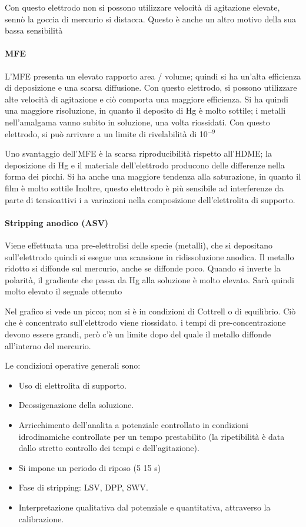 Con questo elettrodo non si possono utilizzare velocità di agitazione elevate, sennò la goccia di mercurio si distacca.
Questo è anche un altro motivo della sua bassa sensibilità

\paragraph{MFE}
L'MFE presenta un elevato rapporto area / volume; quindi si ha un'alta efficienza di deposizione e una scarsa diffusione.
Con questo elettrodo, si possono utilizzare alte velocità di agitazione e ciò comporta una maggiore efficienza.
Si ha quindi una maggiore risoluzione, in quanto il deposito di Hg è molto sottile; i metalli nell'amalgama vanno subito in soluzione, una volta riossidati.
Con questo elettrodo, si può arrivare a un limite di rivelabilità di 10$^{-9}$

Uno svantaggio dell'MFE è la scarsa riproducibilità rispetto all'HDME;
la deposizione di Hg e il materiale dell'elettrodo producono delle differenze nella forma dei picchi.
Si ha anche una maggiore tendenza alla saturazione, in quanto il film è molto sottile
Inoltre, questo elettrodo è più sensibile ad interferenze da parte di tensioattivi i a variazioni nella composizione dell'elettrolita di supporto.

\paragraph{Stripping anodico (ASV)}
Viene effettuata una pre-elettrolisi delle specie (metalli), che si depositano sull'elettrodo quindi si esegue una scansione in ridissoluzione anodica.
Il metallo ridotto si diffonde sul mercurio, anche se diffonde poco. Quando si inverte la polarità, il gradiente che passa da Hg alla soluzione è molto elevato.
Sarà quindi molto elevato il segnale ottenuto

Nel grafico si vede un picco; non si è in condizioni di Cottrell o di equilibrio.
Ciò che è concentrato sull'elettrodo viene riossidato.
i tempi di pre-concentrazione devono essere grandi, però c'è un limite dopo del quale il metallo diffonde all'interno del mercurio.


Le condizioni operative generali sono:
\begin{itemize}
\item Uso di elettrolita di supporto.
\item Deossigenazione della soluzione.
\item Arricchimento dell'analita a potenziale controllato in condizioni idrodinamiche controllate per un tempo prestabilito (la ripetibilità è data dallo stretto controllo dei tempi e dell'agitazione).
\item Si impone un periodo di riposo (5 15 s)
\item Fase di stripping: LSV, DPP, SWV.
\item Interpretazione qualitativa dal potenziale e quantitativa, attraverso la calibrazione.
\end{itemize}

